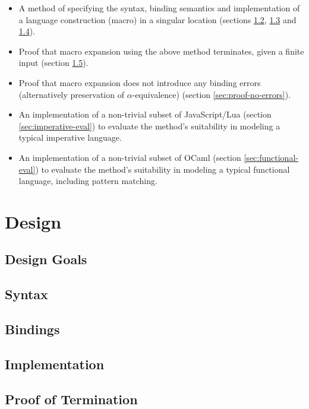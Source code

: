 \documentclass{kththesis}
\begin{document}
\begin{itemize}
  \item A method of specifying the syntax, binding semantics and implementation of a language construction (macro) in a singular location (sections \ref{sec:design-syntax}, \ref{sec:design-bindings} and \ref{sec:design-implementation}).
  \item Proof that macro expansion using the above method terminates, given a finite input (section \ref{sec:proof-termination}).
  \item Proof that macro expansion does not introduce any binding errors (alternatively preservation of $\alpha$-equivalence) (section \ref{sec:proof-no-errors}).
  \item An implementation of a non-trivial subset of JavaScript/Lua (section \ref{sec:imperative-eval}) to evaluate the method's suitability in modeling a typical imperative language.
  \item An implementation of a non-trivial subset of OCaml (section \ref{sec:functional-eval}) to evaluate the method's suitability in modeling a typical functional language, including pattern matching.
\end{itemize}

\chapter{Design}

\section{Design Goals}

\section{Syntax} \label{sec:design-syntax}

\section{Bindings} \label{sec:design-bindings}

\section{Implementation} \label{sec:design-implementation}

\section{Proof of Termination} \label{sec:proof-termination}
\end{document}
